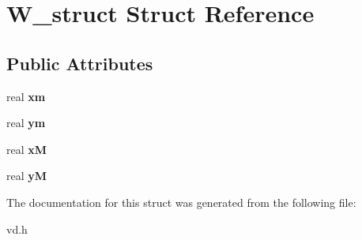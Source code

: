 \hypertarget{structW__struct}{}\section{W\+\_\+struct Struct Reference}
\label{structW__struct}
\subsection*{Public Attributes}
\begin{DoxyCompactItemize}
\item 
\mbox{\label{structW__struct_a7c0ed763a5701a0787361a68cad4aec4}} 
real {\bfseries xm}
\item 
\mbox{\label{structW__struct_a69290893bf3fc1a9bf0ff987a9e25320}} 
real {\bfseries ym}
\item 
\mbox{\label{structW__struct_a20e12df215aaa6a737a15b05e6102093}} 
real {\bfseries xM}
\item 
\mbox{\label{structW__struct_a10de004bf31c6563ad0a55116a96cd8d}} 
real {\bfseries yM}
\end{DoxyCompactItemize}


The documentation for this struct was generated from the following file\+:\begin{DoxyCompactItemize}
\item 
vd.\+h\end{DoxyCompactItemize}
